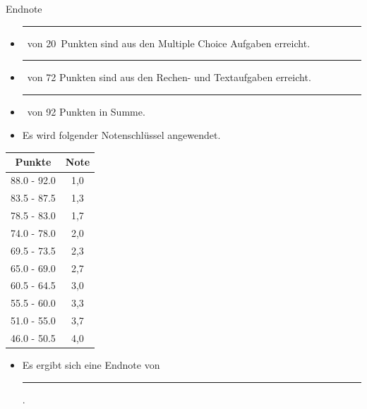 \documentclass[a4paper, 9pt]{scrartcl}\usepackage[]{graphicx}\usepackage[]{xcolor}
\begin{document}
\begin{graybox}{Endnote}
  \vspace{1Ex}
  \begin{itemize}
  \item[] \rule[0ex]{3em}{.4pt}\, von 20\, Punkten sind aus den Multiple
    Choice Aufgaben erreicht.
  \item[] \rule[0ex]{3em}{.4pt}\, von 72 Punkten sind aus den Rechen- und
    Textaufgaben erreicht. 
  \item[] \rule[0ex]{3em}{.4pt}\, von 92 Punkten in Summe.
  \item[] Es wird folgender Notenschlüssel angewendet.   
  \end{itemize}
  \vspace{1ex}
\begin{center}
  \begin{tabular}[c]{cc}
    \toprule
    \textbf{Punkte}	&	\textbf{Note}	\\
    \midrule
    88.0 - 92.0	&	1,0	\\
    83.5 - 87.5	&	1,3	\\
    78.5 - 83.0	&	1,7	\\
    74.0 - 78.0	&	2,0	\\
    69.5 - 73.5	&	2,3	\\
    65.0 - 69.0	&	2,7	\\
    60.5 - 64.5	&	3,0	\\
    55.5 - 60.0	&	3,3	\\
    51.0 - 55.0	&	3,7	\\
    46.0 - 50.5	&	4,0	\\
    \bottomrule
  \end{tabular}
\end{center}
  \vspace{1ex}
\begin{itemize}
\item[] Es ergibt sich eine Endnote von \rule[0ex]{4em}{.4pt}.
\end{itemize}
  \vspace{1Ex}
\end{graybox}

\newpage
\end{document}
